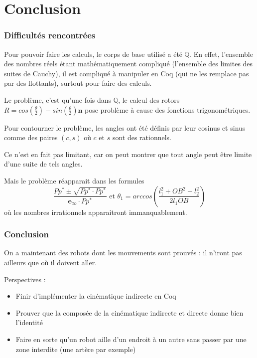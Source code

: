 \documentclass{beamer}
\newcommand{\e}[1]{\bm{e_{#1}}}
\newcommand{\ei}{\e{\infty}}
\newcommand{\Q}{\mathbb{Q}}
\begin{document}
\section{Conclusion}
\begin{frame}
\frametitle{Difficultés rencontrées}
Pour pouvoir faire les calculs, le corps de base utilisé a été $\Q$. En effet, l'ensemble des nombres réels étant mathématiquement compliqué (l'ensemble des limites des suites de Cauchy), il est compliqué à manipuler en Coq (qui ne les remplace pas par des flottants), surtout pour faire des calculs. \pause \bigskip

Le problème, c'est qu'une fois dans $\Q$, le calcul des rotors $R = cos\left(\frac{\theta}{2}\right)- sin\left(\frac{\theta}{2}\right) \bm{n}$ pose problème à cause des fonctions trigonométriques.
\end{frame}

\begin{frame}
Pour contourner le problème, les angles ont été définis par leur cosinus et sinus comme des paires $(c,s)$ où $c$ et $s$ sont des rationnels. \pause \bigskip

Ce n'est en fait pas limitant, car on peut montrer que tout angle peut être limite d'une suite de tels angles.\pause \bigskip

Mais le problème réapparait dans les formules $$\frac{Pp^* \pm \sqrt{Pp^* \cdot Pp^*} }{\ei \cdot Pp^*} \text{ et } \theta_1 = arccos \left(\frac{l_1^2+OB^2-l_2^2}{2 l_1 OB}\right)$$ où les nombres irrationnels apparaitront immanquablement.
\end{frame}

\begin{frame}
\frametitle{Conclusion}

On a maintenant des robots dont les mouvements sont prouvés : il n'iront pas ailleurs que où il doivent aller. 
\pause\bigskip


Perspectives : \begin{itemize}
\item Finir d'implémenter la cinématique indirecte en Coq\pause
\item Prouver que la composée de la cinématique indirecte et directe donne bien l'identité\pause
\item Faire en sorte qu'un robot aille d'un endroit à un autre sans passer par une zone interdite (une artère par exemple)
\end{itemize} 

\end{frame}

\end{document}
